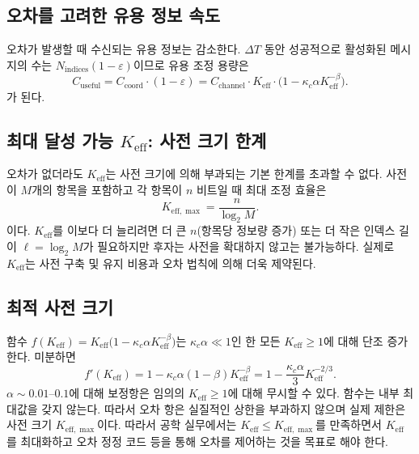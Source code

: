 \documentclass[12pt,a4paper]{article}
\newcommand{\Keff}{K_{\mathrm{eff}}}
\newcommand{\Keffmax}{K_{\mathrm{eff},\max}}
\begin{document}
	\subsection{오차를 고려한 유용 정보 속도}
	
	오차가 발생할 때 수신되는 유용 정보는 감소한다. $\Delta T$ 동안 성공적으로 활성화된 메시지의 수는 $N_{\text{indices}}(1 - \varepsilon)$이므로 유용 조정 용량은
	\begin{equation}
		C_{\text{useful}} = C_{\text{coord}} \cdot (1 - \varepsilon) = C_{\text{channel}} \cdot \Keff \cdot \bigl(1 - \kappa_c \alpha K_{\mathrm{eff}}^{-\beta}\bigr).
		\label{eq:useful-rate}
	\end{equation}
	가 된다.
	
	\subsection{최대 달성 가능 $\Keff$: 사전 크기 한계}
	
	오차가 없더라도 $\Keff$는 사전 크기에 의해 부과되는 기본 한계를 초과할 수 없다. 사전이 $M$개의 항목을 포함하고 각 항목이 $n$ 비트일 때 최대 조정 효율은
	\begin{equation}
		\Keffmax = \frac{n}{\log_2 M}. \label{eq:keff-max}
	\end{equation}
	이다. $\Keff$를 이보다 더 늘리려면 더 큰 $n$(항목당 정보량 증가) 또는 더 작은 인덱스 길이 $\ell = \log_2 M$가 필요하지만 후자는 사전을 확대하지 않고는 불가능하다. 실제로 $\Keff$는 사전 구축 및 유지 비용과 오차 법칙에 의해 더욱 제약된다.
	
	\subsection{최적 사전 크기}
	
	함수 $f(\Keff) = \Keff \bigl(1 - \kappa_c \alpha K_{\mathrm{eff}}^{-\beta}\bigr)$는 $\kappa_c\alpha \ll 1$인 한 모든 $\Keff \ge 1$에 대해 단조 증가한다. 미분하면
	\[
	f'(\Keff) = 1 - \kappa_c\alpha(1-\beta)K_{\mathrm{eff}}^{-\beta} = 1 - \frac{\kappa_c\alpha}{3} K_{\mathrm{eff}}^{-2/3}.
	\]
	$\alpha \sim 0.01$–$0.1$에 대해 보정항은 임의의 $\Keff \ge 1$에 대해 무시할 수 있다. 함수는 내부 최대값을 갖지 않는다. 따라서 오차 항은 실질적인 상한을 부과하지 않으며 실제 제한은 사전 크기 $\Keffmax$이다. 따라서 공학 실무에서는 $\Keff \le \Keffmax$를 만족하면서 $\Keff$를 최대화하고 오차 정정 코드 등을 통해 오차를 제어하는 것을 목표로 해야 한다.
	
\end{document}
